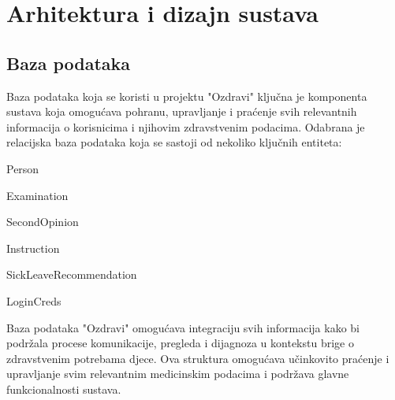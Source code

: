 \chapter{Arhitektura i dizajn sustava}
		

	

					
		\section{Baza podataka}
			
			
        Baza podataka koja se koristi u projektu "Ozdravi" ključna je komponenta sustava koja omogućava pohranu, upravljanje i praćenje svih relevantnih informacija o korisnicima i njihovim zdravstvenim podacima. Odabrana je relacijska baza podataka koja se sastoji od nekoliko ključnih entiteta:
            \begin{packed_item}
                \item Person
                \item Examination
                \item SecondOpinion
                \item Instruction
                \item SickLeaveRecommendation
                \item LoginCreds
            \end{packed_item}

        Baza podataka "Ozdravi" omogućava integraciju svih informacija kako bi podržala procese komunikacije, pregleda i dijagnoza u kontekstu brige o zdravstvenim potrebama djece. Ova struktura omogućava učinkovito praćenje i upravljanje svim relevantnim medicinskim podacima i podržava glavne funkcionalnosti sustava.
        
